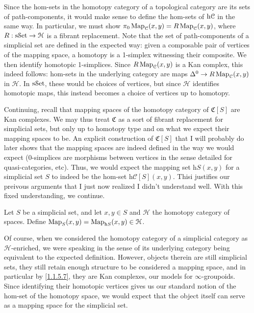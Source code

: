 Since the hom-sets in the homotopy category of a topological category are its sets of path-components, it would make sense to define the hom-sets of $\mathrm{h} \mathcal{C} $ in the same way. In particular, we must show $\pi _0\operatorname{Map}_\mathcal{C} (x,y)=R\operatorname{Map}_\mathcal{C} (x,y)$, where $R : \mathrm{s}\mathcal{S}\mathrm{et}  \to \mathcal{H} $ is a fibrant replacement. Note that the set of path-components of a simplicial set are defined in the expected way: given a composable pair of vertices of the mapping space, a homotopy is a 1-simplex witnessing their composite. We then identify homotopic 1-simplices. Since $R\operatorname{Map}_\mathcal{C} (x,y)$ is a Kan complex, this indeed follows: hom-sets in the underlying category are maps $\Delta ^0\to R\operatorname{Map}_\mathcal{C} (x,y)$ in $\mathcal{H} $. In $\mathrm{s}\mathcal{S}\mathrm{et} $, these would be choices of vertices, but since $\mathcal{H} $ identifies homotopic maps, this instead becomes a choice of vertices up to homotopy.

Continuing, recall that mapping spaces of the homotopy category of $\mathfrak{C} [S]$ are Kan complexes. We may thus treat $\mathfrak{C} $ as a sort of fibrant replacement for simplicial sets, but only up to homotopy type and on what we expect their mapping spaces to be. An explicit construction of $\mathfrak{C} [S]$ that I will probably do later shows that the mapping spaces are indeed defined in the way we would expect (0-simplices are morphisms between vertices in the sense detailed for quasi-categories, etc). Thus, we would expect the mapping set $\mathrm{h} S(x,y)$ for a simplicial set $S$ to indeed be the hom-set $\mathrm{h} \mathcal{C} [S](x,y)$. Thisi justifies our preivous arguments that I just now realized I didn't understand well. With this fixed understanding, we continue.

\begin{definition}\label{1.2.2.1}
	Let $S$ be a simplicial set, and let $x,y\in S$ and $\mathcal{H} $ the homotopy category of spaces. Define $\operatorname{Map}_S(x,y)=\operatorname{Map}_{\mathrm{h} S} (x,y)\in \mathcal{H} $.
\end{definition}

Of course, when we considered the homotopy category of a simplicial category as $\mathcal{H} $-enriched, we were speaking in the sense of its underlying category being equivalent to the expected definition. However, objects therein are still simplicial sets, they still retain enough structure to be considered a mapping space, and in particular by \cref{1.1.5.7}, they are Kan complexes, our models for $\infty $-groupoids. Since identifying their homotopic vertices gives us our standard notion of the hom-set of the homotopy space, we would expect that the object itself can serve as a mapping space for the simplicial set.

